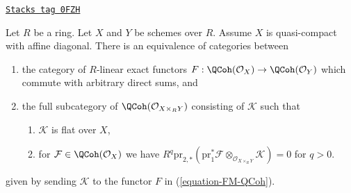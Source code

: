 \begin{lemma}
\label{functors-lemma-functor-quasi-coherent-from-affine-diagonal}
\href{https://stacks.math.columbia.edu/tag/0FZH}{\texttt{Stacks tag 0FZH}}

Let $R$ be a ring. Let $X$ and $Y$ be schemes over $R$. Assume $X$ is
quasi-compact with affine diagonal.
There is an equivalence of categories between
\begin{enumerate}
\item the category of $R$-linear exact functors
$F : \QCoh(\mathcal{O}_X) \to \QCoh(\mathcal{O}_Y)$
which commute with arbitrary direct sums, and
\item the full subcategory of $\QCoh(\mathcal{O}_{X \times_R Y})$ consisting
of $\mathcal{K}$ such that
\begin{enumerate}
\item $\mathcal{K}$ is flat over $X$,
\item for $\mathcal{F} \in \QCoh(\mathcal{O}_X)$ we have
$R^q\text{pr}_{2, *}(\text{pr}_1^*\mathcal{F}
\otimes_{\mathcal{O}_{X \times_R Y}} \mathcal{K}) = 0$ for $q > 0$.
\end{enumerate}
\end{enumerate}
given by sending $\mathcal{K}$ to the functor $F$ in (\ref{equation-FM-QCoh}).
\end{lemma}

